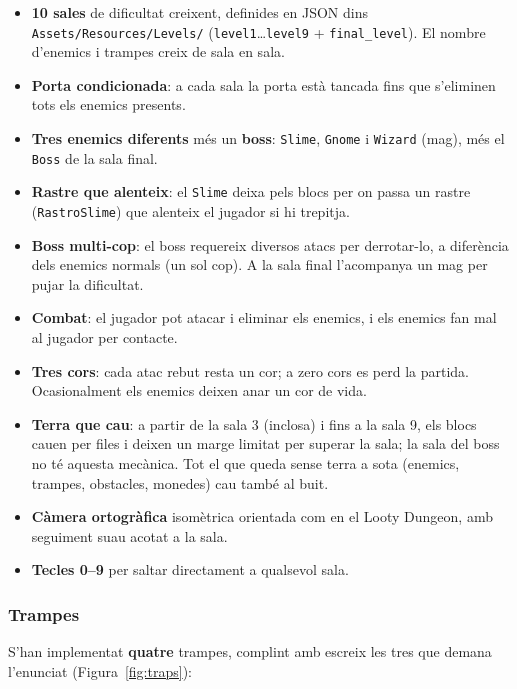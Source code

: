 \documentclass[11pt,a4paper]{article}
\begin{document}
\begin{itemize}[noitemsep]
    \item \textbf{10 sales} de dificultat creixent, definides en JSON dins
    \texttt{Assets/Resources/Levels/} (\texttt{level1}\ldots\texttt{level9} +
    \texttt{final\_level}). El nombre d'enemics i trampes creix de sala en sala.
    \item \textbf{Porta condicionada}: a cada sala la porta està tancada fins que
    s'eliminen tots els enemics presents.
    \item \textbf{Tres enemics diferents} més un \textbf{boss}: \texttt{Slime},
    \texttt{Gnome} i \texttt{Wizard} (mag), més el \texttt{Boss} de la sala final.
    \item \textbf{Rastre que alenteix}: el \texttt{Slime} deixa pels blocs per on
    passa un rastre (\texttt{RastroSlime}) que alenteix el jugador si hi trepitja.
    \item \textbf{Boss multi-cop}: el boss requereix diversos atacs per
    derrotar-lo, a diferència dels enemics normals (un sol cop). A la sala final
    l'acompanya un mag per pujar la dificultat.
    \item \textbf{Combat}: el jugador pot atacar i eliminar els enemics, i els
    enemics fan mal al jugador per contacte.
    \item \textbf{Tres cors}: cada atac rebut resta un cor; a zero cors es perd la
    partida. Ocasionalment els enemics deixen anar un cor de vida.
    \item \textbf{Terra que cau}: a partir de la sala 3 (inclosa) i fins a la sala
    9, els blocs cauen per files i deixen un marge limitat per superar la sala; la
    sala del boss no té aquesta mecànica. Tot el que queda sense terra a sota
    (enemics, trampes, obstacles, monedes) cau també al buit.
    \item \textbf{Càmera ortogràfica} isomètrica orientada com en el Looty
    Dungeon, amb seguiment suau acotat a la sala.
    \item \textbf{Tecles 0--9} per saltar directament a qualsevol sala.
\end{itemize}

\subsubsection{Trampes}

S'han implementat \textbf{quatre} trampes, complint amb escreix les tres que
demana l'enunciat (Figura~\ref{fig:traps}):
\end{document}

